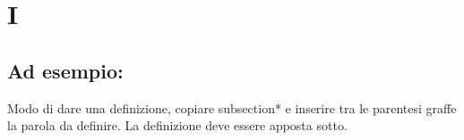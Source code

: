 \section*{I}
\markright{}
\subsection*{Ad esempio:}
Modo di dare una definizione, copiare subsection*{} e inserire tra le parentesi graffe la parola da definire. La definizione deve essere apposta sotto.